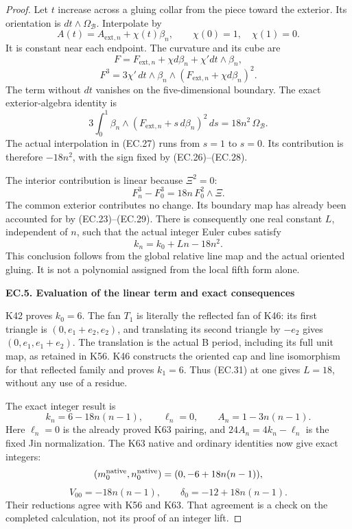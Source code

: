 \begin{proof}
Let \(t\) increase across a gluing collar from the piece toward
the exterior. Its orientation is \(dt\wedge\Omega_{\mathcal B}\).
Interpolate by
\[
 A(t)=A_{\mathrm{ext},n}+\chi(t)\beta_n,\qquad
                  \chi(0)=1,\quad\chi(1)=0.
                                                        \tag{EC.27}
\]
It is constant near each endpoint. The curvature and its cube
are
\[
 F=F_{\mathrm{ext},n}+\chi d\beta_n
                           +\chi' dt\wedge\beta_n,
\]
\[
 F^3=3\chi'\,dt\wedge
          \beta_n\wedge(F_{\mathrm{ext},n}+\chi d\beta_n)^2 .
                                                        \tag{EC.28}
\]
The term without \(dt\) vanishes on the five-dimensional boundary.
The exact exterior-algebra identity is
\[
 3\int_0^1
   \beta_n\wedge(F_{\mathrm{ext},n}+s\,d\beta_n)^2\,ds
                    =18n^2\,\Omega_{\mathcal B}.        \tag{EC.29}
\]
The actual interpolation in (EC.27) runs from \(s=1\) to \(s=0\).
Its contribution is therefore \(-18n^2\), with the sign fixed
by (EC.26)--(EC.28).

The interior contribution is linear because \(\Xi^2=0\):
\[
 F_n^3-F_0^3=18n\,F_0^2\wedge\Xi .
                                                        \tag{EC.30}
\]
The common exterior contributes no change. Its boundary map
has already been accounted for by (EC.23)--(EC.29).
There is consequently one real constant \(L\), independent
of \(n\), such that the actual integer Euler cubes satisfy
\[
                         k_n=k_0+Ln-18n^2 .
                                                        \tag{EC.31}
\]
This conclusion follows from the global relative line map
and the actual oriented gluing. It is not a polynomial assigned
from the local fifth form alone.

\par

\medskip\noindent\textbf{EC.5. Evaluation of the linear term and exact consequences}

\par\nobreak

K42 proves \(k_0=6\). The fan \(T_1\) is literally the reflected
fan of K46: its first triangle is
\((0,e_1+e_2,e_2)\), and translating its second triangle by
\(-e_2\) gives \((0,e_1,e_1+e_2)\). The translation is the
actual B period, including its full unit map, as retained in
K56. K46 constructs the oriented cap and line isomorphism for
that reflected family and proves \(k_1=6\). Thus (EC.31) at
one gives \(L=18\), without any use of a residue.

The exact integer result is
\[
              k_n=6-18n(n-1),\qquad \ell_n=0,\qquad
              A_n=1-3n(n-1).
                                                        \tag{EC.32}
\]
Here \(\ell_n=0\) is the already proved K63 pairing, and
\(24A_n=4k_n-\ell_n\) is the fixed Jin normalization. The
K63 native and ordinary identities now give exact integers:
\[
 (m_0^{\rm native},n_0^{\rm native})
                  =(0,-6+18n(n-1)),
\]
\[
                 V_{00}=-18n(n-1),\qquad
                 \delta_0=-12+18n(n-1).
                                                        \tag{EC.33}
\]
Their reductions agree with K56 and K63. That agreement is a
check on the completed calculation, not its proof of an integer lift.


\end{proof}
